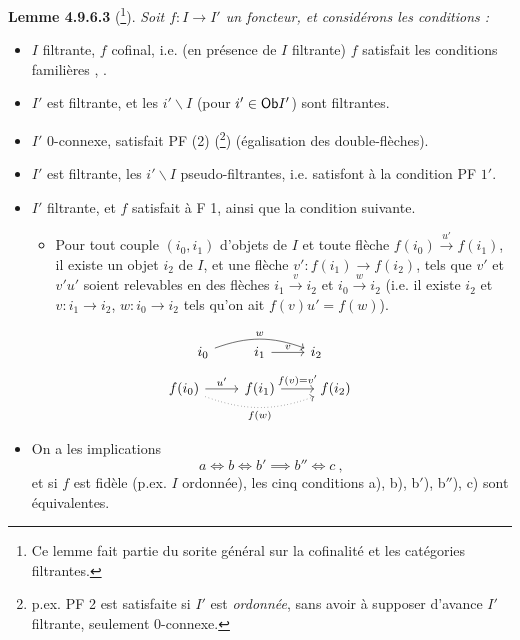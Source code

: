 \textbf{Lemme 4.9.6.3} (\footnote[99]{Ce lemme fait partie du sorite général sur la cofinalité et les catégories filtrantes.}). \textit{Soit $f : I \longrightarrow I'$ un foncteur, et considérons les conditions :}
{\itshape
\begin{itemize}[label={}]
\item[a)] $I$ filtrante, $f$ cofinal, i.e. (en présence de $I$ filtrante) $f$ satisfait les conditions familières , .
\item[b)] $I'$ est filtrante, et les $i'\backslash I$ (pour $i' \in \mathsf{Ob} I'$) sont filtrantes.
\item[b$'$)] $I'$ \textup{0}-connexe, satisfait PF (2) \textup{(}\footnote[100]{p.ex. PF 2 est satisfaite si $I'$ est \textit{ordonnée}, sans avoir à supposer d'avance $I'$ filtrante, seulement 0-connexe.}\textup{)} (égalisation des double-flèches).
\item[b$''$)] $I'$ est filtrante, les $i'\backslash I$ pseudo-filtrantes, i.e. satisfont à la condition PF $1'$.
\item[c)] $I'$ filtrante, et $f$ satisfait à F 1, ainsi que la condition suivante.
\begin{itemize}[label={}]
\item[\rbox{F 3}] Pour tout couple $(i_0,i_1)$ d'objets de $I$ et toute flèche $f(i_0) \xrightarrow{u'} f(i_1)$, il existe un objet $i_2$ de $I$, et une flèche $v' : f(i_1) \longrightarrow f(i_2)$, tels que $v'$ et $v'u'$ soient relevables en des flèches $i_1 \xrightarrow{v} i_2$ et $i_0 \xrightarrow{w} i_2$ (i.e. il existe $i_2$ et $v : i_1 \longrightarrow i_2$, $w : i_0 \longrightarrow i_2$ tels qu'on ait $f(v)u' = f(w)$).
\end{itemize}
\end{itemize}
\[
\begin{tikzcd}
i_0 \arrow[rr, bend left=20, "w"] & i_1 \arrow[r, "v"] & i_2 %
\end{tikzcd}
\]
\[
\begin{tikzcd}
f(i_0) \arrow[r, "u'"] \arrow[rr, dotted, bend right=20, "f(w)"'] & f(i_1) \arrow[r, "f(v) = v'"] & f(i_2)
\end{tikzcd}
\]
\begin{itemize}[label={}]
\item[1)] On a les implications
\[
a \iff b \iff b' \implies b'' \iff c \ ,
\]
et si $f$ est \textup{fidèle} (p.ex. $I$ ordonnée), les cinq conditions a), b), b$'$), b$''$), c) sont équivalentes.
\end{itemize}
}

